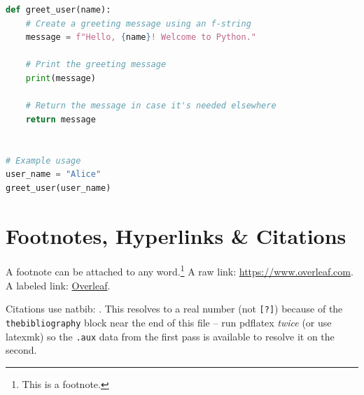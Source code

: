 \documentclass{article}
\begin{document}
\begin{lstlisting}[language=Python, caption={A small Python function.}, label={lst:python-square}]
def greet_user(name):
    # Create a greeting message using an f-string
    message = f"Hello, {name}! Welcome to Python."

    # Print the greeting message
    print(message)

    # Return the message in case it's needed elsewhere
    return message


# Example usage
user_name = "Alice"
greet_user(user_name)
\end{lstlisting}

% 

\section{Footnotes, Hyperlinks \& Citations}

A footnote can be attached to any word.\footnote{This is a footnote.}
A raw link: \url{https://www.overleaf.com}. A labeled link:
\href{https://www.overleaf.com}{Overleaf}.

Citations use natbib: \cite{sample2024}. This resolves to a real number (not
\texttt{[?]}) because of the \texttt{thebibliography} block near the end of
this file -- run pdflatex \emph{twice} (or use latexmk) so the \texttt{.aux}
data from the first pass is available to resolve it on the second.
\end{document}
